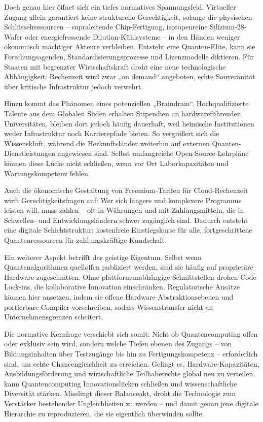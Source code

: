 {Doch genau hier öffnet sich ein tiefes normatives Spannungsfeld. Virtueller Zugang allein garantiert keine strukturelle Gerechtigkeit, solange die physischen Schlüsselressourcen – supraleitende Chip-Fertigung, isotopenreine Silizium-28-Wafer oder energiefressende Dilution-Kühlsysteme – in den Händen weniger ökonomisch mächtiger Akteure verbleiben. Entsteht eine Quanten-Elite, kann sie Forschungsagenden, Standardisierungsprozesse und Lizenzmodelle diktieren. Für Staaten mit begrenzter Wirtschaftskraft droht eine neue technologische Abhängigkeit: Rechenzeit wird zwar „on demand“ angeboten, echte Souveränität über kritische Infrastruktur jedoch verwehrt.

Hinzu kommt das Phänomen eines potenziellen „Braindrain“. Hochqualifizierte Talente aus dem Globalen Süden erhalten Stipendien an hardwareführenden Universitäten, bleiben dort jedoch häufig dauerhaft, weil heimische Institutionen weder Infrastruktur noch Karrierepfade bieten. So vergrößert sich die Wissenskluft, während die Herkunftsländer weiterhin auf externen Quanten-Dienstleistungen angewiesen sind. Selbst umfangreiche Open-Source-Lehrpläne können diese Lücke nicht schließen, wenn vor Ort Laborkapazitäten und Wartungskompetenz fehlen.

Auch die ökonomische Gestaltung von Freemium-Tarifen für Cloud-Rechenzeit wirft Gerechtigkeitsfragen auf: Wer sich längere und komplexere Programme leisten will, muss zahlen – oft in Währungen und mit Zahlungsmitteln, die in Schwellen- und Entwicklungsländern schwer zugänglich sind. Dadurch entsteht eine digitale Schichtstruktur: kostenfreie Einstiegskurse für alle, fortgeschrittene Quantenressourcen für zahlungskräftige Kundschaft.

Ein weiterer Aspekt betrifft das geistige Eigentum. Selbst wenn Quantenalgorithmen quelloffen publiziert werden, sind sie häufig auf proprietäre Hardware zugeschnitten. Ohne plattformunabhängige Schnittstellen drohen Code-Lock-ins, die kollaborative Innovation einschränken. Regulatorische Ansätze können hier ansetzen, indem sie offene Hardware-Abstraktionsebenen und portierbare Compiler vorschreiben, sodass Wissenstransfer nicht an Unternehmensgrenzen scheitert.

Die normative Kernfrage verschiebt sich somit: Nicht ob Quantencomputing offen oder exklusiv sein wird, sondern welche Tiefen ebenen des Zugangs – von Bildungsinhalten über Testzugänge bis hin zu Fertigungskompetenz – erforderlich sind, um echte Chancengleichheit zu erreichen. Gelingt es, Hardware-Kapazitäten, Ausbildungsförderung und wirtschaftliche Teilhaberechte global neu zu verteilen, kann Quantencomputing Innovationslücken schließen und wissenschaftliche Diversität stärken. Misslingt dieser Balanceakt, droht die Technologie zum Verstärker bestehender Ungleichheiten zu werden – und damit genau jene digitale Hierarchie zu reproduzieren, die sie eigentlich überwinden sollte. \cite{seskirDemocratizationQuantumTechnologies2022}
}
